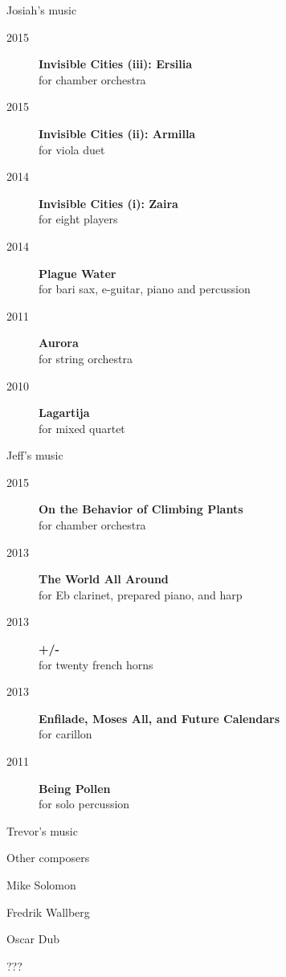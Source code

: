 \documentclass[10pt]{beamer}
\begin{document}
\begin{frame}{Josiah's music}
    \begin{description}
        \item[2015] \textbf{Invisible Cities (iii): Ersilia} \\
            for chamber orchestra
        \item[2015] \textbf{Invisible Cities (ii): Armilla} \\
            for viola duet
        \item[2014] \textbf{Invisible Cities (i): Zaira} \\
            for eight players
        \item[2014] \textbf{Plague Water} \\
            for bari sax, e-guitar, piano and percussion
        \item[2011] \textbf{Aurora} \\
            for string orchestra
        \item[2010] \textbf{Lagartija} \\
            for mixed quartet
    \end{description}
\end{frame}

\begin{frame}{Jeff's music}
\begin{description}
\item[2015]\textbf{On the Behavior of Climbing Plants} \\ for chamber orchestra
\item[2013]\textbf{The World All Around} \\ for Eb clarinet, prepared piano, and harp
\item[2013]\textbf{+/-} \\ for twenty french horns
\item[2013]\textbf{Enfilade, Moses All, and Future Calendars} \\ for carillon
\item[2011]\textbf{Being Pollen} \\ for solo percussion

\end{description}
\end{frame}

\begin{frame}{Trevor's music}
\end{frame}

\begin{frame}{Other composers}
\begin{description}
\item Mike Solomon
\item Fredrik Wallberg
\item Oscar Dub
\item ???
\end{description}
\end{frame}
\end{document}
